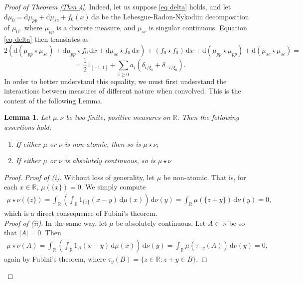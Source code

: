 \documentclass[11pt, reqno]{amsart}
\newcommand{\mmd}{ \mathrm{d}}
\newcommand{\s}{\star}
\numberwithin{equation}{section}
\newtheorem{lemma}[theorem]{Lemma}
\newcommand{\R}{{\mathbb R}}
\begin{document}
\begin{proof}[Proof of Theorem \ref{Thm 4}]
\noindent Indeed, let us suppose \eqref{eq delta} holds, and let $\mmd \mu_0 = \mmd \mu_{pp} + \mmd \mu_{sc} + f_0(x) \, \mmd x$ be the Lebesgue-Radon-Nykodim decomposition of $\mu_0,$ where 
$\mu_{pp}$ is a discrete measure, and $\mu_{sc}$ is singular continuous. Equation \eqref{eq delta} then translates as 
\[
2 (\mmd (\mu_{pp} \s \mu_{sc}) + \mmd \mu_{pp} \s f_0 \, \mmd x + \mmd \mu_{sc} \s f_0 \, \mmd x) + (f_0 \s f_0) \, \mmd x + \mmd (\mu_{pp} \s \mu_{pp}) + \mmd (\mu_{sc} \s \mu_{sc}) =
\]
\begin{equation}\label{eq expand}
=  \frac{1}{2} 1_{[-1,1]} + \sum_{i \ge 0} a_i (\delta_{i/\xi_0} + \delta_{-i/\xi_0}). 
\end{equation}
In order to better understand this equality, we must first understand the interactions between measures of different
nature when convolved. This is the content of the following Lemma. 

\begin{lemma}\label{lemma convolution} Let $\mu,\nu$ be two finite, positive measures on $\R$. Then the following assertions hold: 
\begin{enumerate}
 \item[(i)] If either $\mu$ or $\nu$ is non-atomic, then so is $\mu \s \nu;$
 \item[(ii)] If either $\mu$ or $\nu$ is absolutely continuous, so is $\mu \s \nu$ 
\end{enumerate}
\end{lemma}

\begin{proof} 

\noindent\textit{Proof of (i).} Without loss of generality, let $\mu$ be non-atomic. That is, for each $x \in \R, \, \mu(\{x\})=0.$ We simply compute
\begin{align*}
\mu \s \nu(\{z\}) = \int_{\R} \left( \int_{\R} 1_{\{z\}}(x-y) \, \mmd \mu(x) \right)\, \mmd \nu(y) = \int_{\R} \mu(\{z+y\}) \, \mmd \nu(y) =0,
\end{align*}
which is a direct consequence of Fubini's theorem. \\

\noindent\textit{Proof of (ii).} In the same way, let $\mu$ be absolutely continuous. Let $A \subset \R$ be so that $|A| = 0.$ Then 
\begin{align*}
\mu \s \nu(A) = \int_{\R} \left(\int_{\R} 1_{A}(x-y) \, \mmd \mu(x)\right) \, \mmd \nu(y) = \int_{\R} \mu(\tau_{-y}(A)) \, \mmd \nu (y) = 0,
\end{align*}
again by Fubini's theorem, where $\tau_y(B) = \{z \in \R \colon z+ y \in B\}.$ 
\end{proof}


\end{proof}
\end{document}
